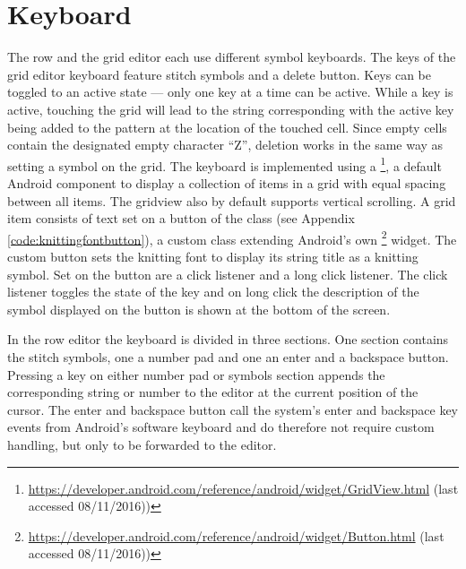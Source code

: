 \section{Keyboard}
The row and the grid editor each use different symbol keyboards. The keys of the grid editor keyboard feature stitch symbols and a delete button. Keys can be toggled to an active state --- only one key at a time can be active. While a key is active, touching the grid will lead to the string corresponding with the active key being added to the pattern at the location of the touched cell. Since empty cells contain the designated empty character ``Z'', deletion works in the same way as setting a symbol on the grid. The keyboard is implemented using a \footnote{\url{https://developer.android.com/reference/android/widget/GridView.html} (last accessed 08/11/2016))}, a default Android component to display a collection of items in a grid with equal spacing between all items. The gridview also by default supports vertical scrolling. A grid item consists of text set on a button of the class  (see Appendix \ref{code:knittingfontbutton}), a custom class extending Android’s own \footnote{\url{https://developer.android.com/reference/android/widget/Button.html} (last accessed 08/11/2016))} widget. The custom button sets the knitting font to display its string title as a knitting symbol. Set on the button are a click listener and a long click listener. The click listener toggles the state of the key and on long click the description of the symbol displayed on the button is shown at the bottom of the screen.

In the row editor the keyboard is divided in three sections. One section contains the stitch symbols, one a number pad and one an enter and a backspace button. Pressing a key on either number pad or symbols section appends the corresponding string or number to the editor at the current position of the cursor. The enter and backspace button call the system’s enter and backspace key events from Android’s software keyboard and do therefore not require custom handling, but only to be forwarded to the editor.

